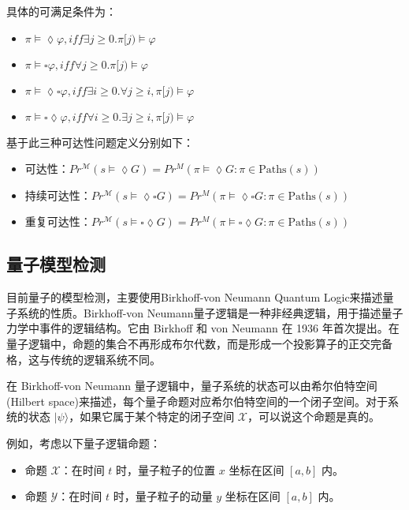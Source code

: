 具体的可满足条件为：
\begin{itemize}
    \item \(\pi\models\lozenge\varphi,iff\exists j\ge0.\pi[j)\models\varphi\)
    \item \(\pi\models\square\varphi,iff\forall j\ge 0.\pi[j)\models\varphi\)
    \item \(\pi\models\lozenge\square\varphi,iff\exists i\ge 0.\forall j\ge i,\pi[j)\models\varphi\)
    \item \(\pi\models\square\lozenge\varphi,iff\forall i\ge 0.\exists j\ge i,\pi[j)\models\varphi\)
\end{itemize}
基于此三种可达性问题定义分别如下：
\begin{itemize}
    \item 可达性：\( Pr^{\mathcal{M}}(s \models \lozenge G) = Pr^M(\pi \models \lozenge G : \pi \in \text{Paths}(s))\)
    \item 持续可达性：\( Pr^{\mathcal{M}}(s \models \lozenge \square G) = Pr^M(\pi \models \lozenge \square G : \pi \in \text{Paths}(s))\)
    \item 重复可达性：\( Pr^{\mathcal{M}}(s \models\square \lozenge G) = Pr^M(\pi \models \square\lozenge G : \pi \in \text{Paths}(s))\)
\end{itemize}
\subsection{量子模型检测}
目前量子的模型检测，主要使用Birkhoff-von Neumann Quantum Logic来描述量子系统的性质\citep{birkhoff1987logic}。Birkhoff-von Neumann量子逻辑是一种非经典逻辑，用于描述量子力学中事件的逻辑结构。它由 Birkhoff 和 von Neumann 在 1936 年首次提出。在量子逻辑中，命题的集合不再形成布尔代数，而是形成一个投影算子的正交完备格，这与传统的逻辑系统不同。

在 Birkhoff-von Neumann 量子逻辑中，量子系统的状态可以由希尔伯特空间(Hilbert space)来描述，每个量子命题对应希尔伯特空间的一个闭子空间。对于系统的状态 \(|\psi\rangle\)，如果它属于某个特定的闭子空间 \( \mathcal{X} \)，可以说这个命题是真的。

例如，考虑以下量子逻辑命题：

\begin{itemize}
\item 命题 \( \mathcal{X} \)：在时间 \( t \) 时，量子粒子的位置 \( x \) 坐标在区间 \( [a, b] \) 内。
\item 命题 \( \mathcal{Y} \)：在时间 \( t \) 时，量子粒子的动量 \( y \) 坐标在区间 \( [a, b] \) 内。
\end{itemize}

